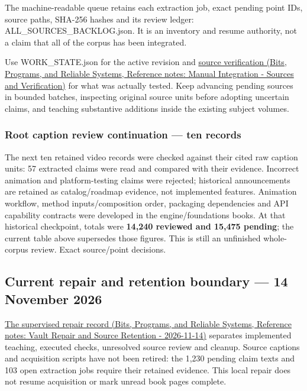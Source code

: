 The machine-readable queue retains each extraction job, exact pending point IDs, source paths, SHA-256 hashes and its review ledger: {ALL\_SOURCES\_BACKLOG.json}. It is an inventory and resume authority, not a claim that all of the corpus has been integrated.

Use {WORK\_STATE.json} for the active revision and \href{../01-Bits-Programs-and-Reliable-Systems/main.pdf\#nameddest=appendix-3b67654799a2}{source verification (Bits, Programs, and Reliable Systems, Reference notes: Manual Integration - Sources and Verification)} for what was actually tested. Keep advancing pending sources in bounded batches, inspecting original source units before adopting uncertain claims, and teaching substantive additions inside the existing subject volumes.

\subsubsection{Root caption review continuation --- ten records}\label{appendix-ac1f51db5e9a-root-caption-review-continuation-ten-records}

The next ten retained video records were checked against their cited raw caption units: 57 extracted claims were read and compared with their evidence. Incorrect animation and platform-testing claims were rejected; historical announcements are retained as catalog/roadmap evidence, not implemented features. Animation workflow, method inputs/composition order, packaging dependencies and API capability contracts were developed in the engine/foundations books. At that historical checkpoint, totals were \textbf{14,240 reviewed and 15,475 pending}; the current table above supersedes those figures. This is still an unfinished whole-corpus review. {Exact source/point decisions}.

\subsection{Current repair and retention boundary --- 14 November 2026}\label{appendix-ac1f51db5e9a-current-repair-and-retention-boundary-14-november-2026}

\href{../01-Bits-Programs-and-Reliable-Systems/main.pdf\#nameddest=appendix-faa2b5a8e820}{The supervised repair record (Bits, Programs, and Reliable Systems, Reference notes: Vault Repair and Source Retention - 2026-11-14)} separates implemented teaching, executed checks, unresolved source review and cleanup. Source captions and acquisition scripts have not been retired: the 1,230 pending claim texts and 103 open extraction jobs require their retained evidence. This local repair does not resume acquisition or mark unread book pages complete.
